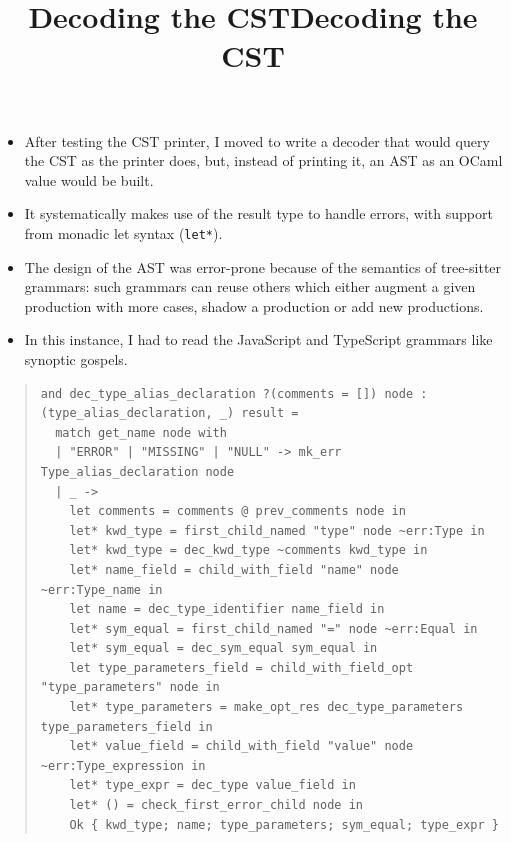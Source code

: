 \documentclass[wide]{slides}
\newcommand{\OCaml}[0]{\textsf{OCaml}}
\newcommand{\JavaScript}[0]{\textsf{JavaScript}}
\newcommand{\TypeScript}[0]{\textsf{TypeScript}}
\newcommand{\TreeSitter}[0]{\textsf{tree-sitter}}
\begin{document}
\begin{slide}
  \title{Decoding the CST}

  \begin{itemize}

    \item After testing the CST printer, I moved to write a decoder
      that would query the CST as the printer does, but, instead of
      printing it, an AST as an \OCaml{} value would be built.

    \item It systematically makes use of the result type to handle
      errors, with support from monadic let syntax (\verb|let*|).

    \item The design of the AST was error\hyp{}prone because of the
      semantics of \TreeSitter{} grammars: such grammars can reuse
      others which either augment a given production with more cases,
      shadow a production or add new productions.

    \item In this instance, I had to read the \JavaScript{} and
      \TypeScript{} grammars like synoptic gospels.

  \end{itemize}

\end{slide}

\begin{slide}
  \title{Decoding the CST}

  \begin{quote}
    \lstset{basicstyle=\scriptsize}
    \begin{lstlisting}[language=caml]
and dec_type_alias_declaration ?(comments = []) node : (type_alias_declaration, _) result =
  match get_name node with
  | "ERROR" | "MISSING" | "NULL" -> mk_err Type_alias_declaration node
  | _ ->
    let comments = comments @ prev_comments node in
    let* kwd_type = first_child_named "type" node ~err:Type in
    let* kwd_type = dec_kwd_type ~comments kwd_type in
    let* name_field = child_with_field "name" node ~err:Type_name in
    let name = dec_type_identifier name_field in
    let* sym_equal = first_child_named "=" node ~err:Equal in
    let* sym_equal = dec_sym_equal sym_equal in
    let type_parameters_field = child_with_field_opt "type_parameters" node in
    let* type_parameters = make_opt_res dec_type_parameters type_parameters_field in
    let* value_field = child_with_field "value" node ~err:Type_expression in
    let* type_expr = dec_type value_field in
    let* () = check_first_error_child node in
    Ok { kwd_type; name; type_parameters; sym_equal; type_expr }
    \end{lstlisting}
  \end{quote}

\end{slide}
\end{document}
